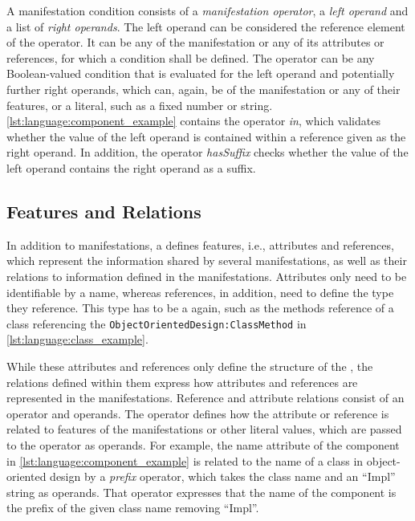 A manifestation condition consists of a \emph{manifestation operator}, a \emph{left operand} and a list of \emph{right operands}.
The left operand can be considered the reference element of the operator. 
It can be any \metaclass of the manifestation or any of its attributes or references, for which a condition shall be defined.
The operator can be any Boolean-valued condition that is evaluated for the left operand and potentially further right operands, which can, again, be \metaclasses of the manifestation or any of their features, or a literal, such as a fixed number or string.
\autoref{lst:language:component_example} contains the operator \emph{in}, which validates whether the value of the left operand is contained within a reference given as the right operand.
In addition, the operator \emph{hasSuffix} checks whether the value of the left operand contains the right operand as a suffix.


\subsection{Features and Relations}
\label{chap:language:commonalities:features}

In addition to manifestations, a \commonality defines features, i.e., attributes and references, which represent the information shared by several manifestations, as well as their relations to information defined in the manifestations.
Attributes only need to be identifiable by a name, whereas references, in addition, need to define the type they reference.
This type has to be a \commonality again, such as the methods reference of a class referencing the \commonality \texttt{ObjectOrientedDesign:ClassMethod} in \autoref{lst:language:class_example}.

While these attributes and references only define the structure of the \commonality, the relations defined within them express how attributes and references are represented in the manifestations.
Reference and attribute relations consist of an operator and operands.
The operator defines how the \commonality attribute or reference is related to features of the manifestations or other literal values, which are passed to the operator as operands.
For example, the name attribute of the component \commonality in \autoref{lst:language:component_example} is related to the name of a class in object-oriented design by a \emph{prefix} operator, which takes the class name and an \enquote{Impl} string as operands.
That operator expresses that the name of the component \commonality is the prefix of the given class name removing \enquote{Impl}.

